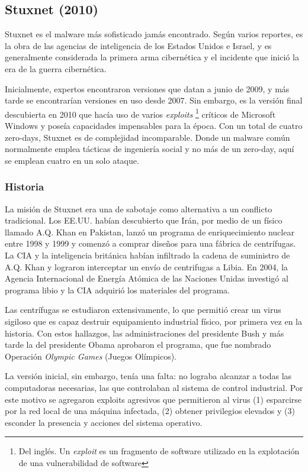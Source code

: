 \documentclass{article}
\begin{document}
\subsection{Stuxnet (2010)}
Stuxnet es el malware más sofisticado jamás encontrado. Según varios reportes, es la obra de las agencias de inteligencia de los Estados Unidos e Israel, y es generalmente considerada la primera arma cibernética y el incidente que inició la era de la guerra cibernética.

Inicialmente, expertos encontraron versiones que datan a junio de 2009, y más tarde se encontrarían versiones en uso desde 2007. Sin embargo, es la versión final descubierta en 2010 que hacía uso de varios {\it exploits} \footnote{Del inglés. Un {\it exploit} es un fragmento de software utilizado en la explotación de una vulnerabilidad de software} críticos de Microsoft Windows y poseía capacidades impensables para la época. Con un total de cuatro zero-days, Stuxnet es de complejidad incomparable. Donde un malware común normalmente emplea tácticas de ingeniería social y no más de un zero-day, aquí se emplean cuatro en un solo ataque. \autocite{symantec-stuxnet} \autocite{reuters-stuxnet}

\subsubsection{Historia}
La misión de Stuxnet era una de sabotaje como alternativa a un conflicto tradicional. Los EE.UU. habían descubierto que Irán, por medio de un físico llamado A.Q. Khan en Pakistan, lanzó un programa de enriquecimiento nuclear entre 1998 y 1999 y comenzó a comprar diseños para una fábrica de centrífugas. La CIA y la inteligencia británica habían infiltrado la cadena de suministro de A.Q. Khan y lograron interceptar un envío de centrifugas a Libia. En 2004, la Agencia Internacional de Energía Atómica de las Naciones Unidas investigó al programa libio y la CIA adquirió los materiales del programa.

Las centrífugas se estudiaron extensivamente, lo que permitió crear un virus sigiloso que es capaz destruir equipamiento industrial físico, por primera vez en la historia. Con estos hallazgos, las administraciones del presidente Bush y más tarde la del presidente Obama aprobaron el programa, que fue nombrado Operación {\it Olympic Games} (Juegos Olímpicos).

La versión inicial, sin embargo, tenía una falta: no lograba alcanzar a todas las computadoras necesarias, las que controlaban al sistema de control industrial. Por este motivo se agregaron exploits agresivos que permitieron al virus (1) esparcirse por la red local de una máquina infectada, (2) obtener privilegios elevados y (3) esconder la presencia y acciones del sistema operativo. 
\end{document}
